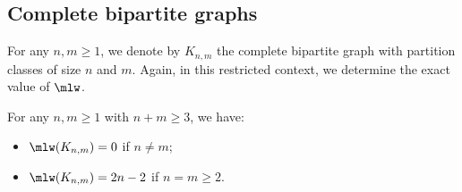 \documentclass[a4paper,11pt,dvipsnames]{elsarticle}
\begin{document}



\subsection{Complete bipartite graphs}

For any $n,m \geq 1$, we denote by $K_{n,m}$ the complete bipartite graph with partition classes of size $n$ and $m$.
Again, in this restricted context, we determine the exact value of $\mlw$.

\begin{theorem}\label{theorem:complete-bipartite}
For any $n,m \geq 1$ with $n+m \geq 3$, we have:
\begin{itemize}
	\item $\mlw(K_{n,m})=0$ if $n \neq m$;
	\item $\mlw(K_{n,m})=2n-2$ if $n=m \geq 2$.
\end{itemize}
\end{theorem}
\end{document}
